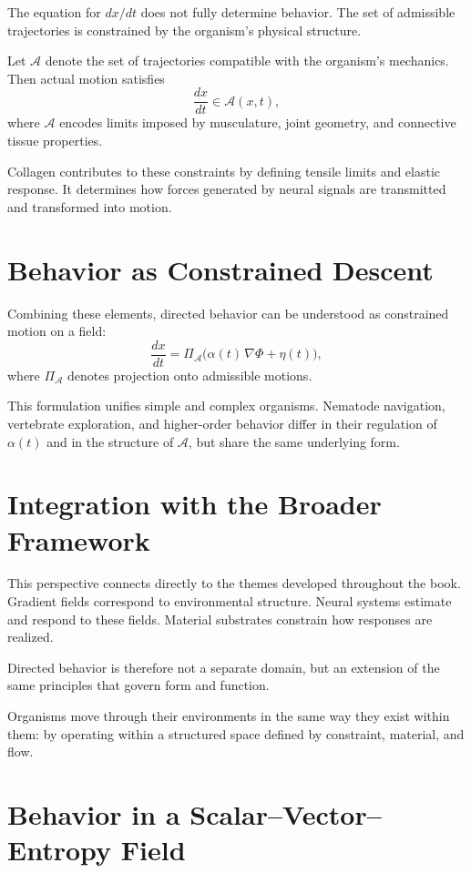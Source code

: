 \documentclass[11pt,oneside]{book}
\begin{document}
The equation for $dx/dt$ does not fully determine behavior. The set of admissible trajectories is constrained by the organism’s physical structure.

Let $\mathcal{A}$ denote the set of trajectories compatible with the organism’s mechanics. Then actual motion satisfies
\[
\frac{dx}{dt} \in \mathcal{A}(x,t),
\]
where $\mathcal{A}$ encodes limits imposed by musculature, joint geometry, and connective tissue properties.

Collagen contributes to these constraints by defining tensile limits and elastic response. It determines how forces generated by neural signals are transmitted and transformed into motion.

\section{Behavior as Constrained Descent}

Combining these elements, directed behavior can be understood as constrained motion on a field:
\[
\frac{dx}{dt} = \Pi_{\mathcal{A}} \big( \alpha(t)\,\nabla \Phi + \eta(t) \big),
\]
where $\Pi_{\mathcal{A}}$ denotes projection onto admissible motions.

This formulation unifies simple and complex organisms. Nematode navigation, vertebrate exploration, and higher-order behavior differ in their regulation of $\alpha(t)$ and in the structure of $\mathcal{A}$, but share the same underlying form.

\section{Integration with the Broader Framework}

This perspective connects directly to the themes developed throughout the book. Gradient fields correspond to environmental structure. Neural systems estimate and respond to these fields. Material substrates constrain how responses are realized.

Directed behavior is therefore not a separate domain, but an extension of the same principles that govern form and function.

Organisms move through their environments in the same way they exist within them: by operating within a structured space defined by constraint, material, and flow.

\section{Behavior in a Scalar--Vector--Entropy Field}
\end{document}
